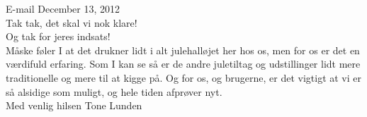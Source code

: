 \begin{fancyquotes}
E-mail December 13, 2012\\
Tak tak, det skal vi nok klare!\\
Og tak for jeres indsats!\\
M{\aa}ske f{\o}ler I at det drukner lidt i alt julehall{\o}jet her hos os, men for os er det en v{\ae}rdifuld erfaring. Som I kan se s{\aa} er de andre juletiltag og udstillinger lidt mere traditionelle og mere til at kigge p{\aa}. Og for os, og brugerne, er det vigtigt at vi er s{\aa} alsidige som muligt, og hele tiden afpr{\o}ver nyt.\\
Med venlig hilsen
Tone Lunden
\end{fancyquotes}



